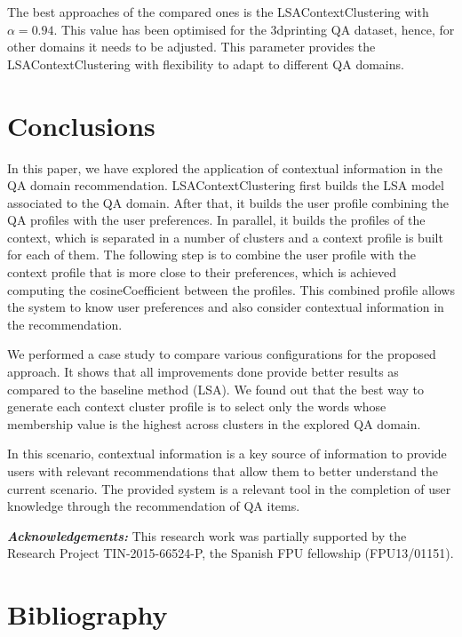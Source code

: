 \documentclass[preprint]{elsarticle}
\begin{document}
\begin{spacing}{2}
The best approaches of the compared ones is the LSAContextClustering with $\alpha=0.94$. This value has been optimised for the 3dprinting QA dataset, hence, for other domains it needs to be adjusted. This parameter provides the LSAContextClustering with flexibility to adapt to different QA domains.

\section{Conclusions}

In this paper, we have explored the application of contextual information in the QA domain recommendation. LSAContextClustering first builds the LSA model associated to the QA domain. After that, it builds the user profile combining the QA profiles with the user preferences. In parallel, it builds the profiles of the context, which is separated in a number of clusters and a context profile is built for each of them. The following step is to combine the user profile with the context profile that is more close to their preferences, which is achieved computing the cosineCoefficient between the profiles. This combined profile allows the system to know user preferences and also consider contextual information in the recommendation. 

We performed a case study to compare various configurations for the proposed approach. It shows that all improvements done provide better results as compared to the baseline method (LSA). We found out that the best way to generate each context cluster profile is to select only the words whose membership value is the highest across clusters in the explored QA domain.

In this scenario, contextual information is a key source of information to provide users with relevant recommendations that allow them to better understand the current scenario. The provided system is a relevant tool in the completion of user knowledge through the recommendation of QA items.

\textbf{\textit{Acknowledgements:}} This research work was partially supported by the Research Project TIN-2015-66524-P, the Spanish FPU fellowship (FPU13/01151).

\section*{Bibliography}


\end{spacing}
\end{document}
